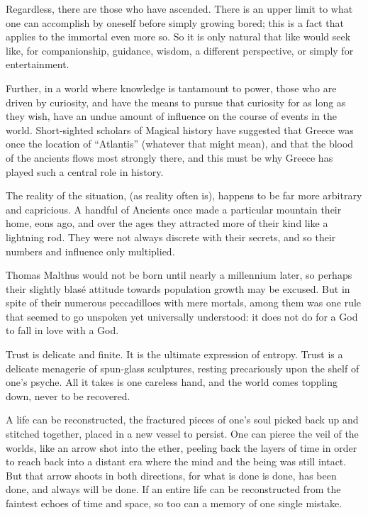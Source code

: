 Regardless, there are those who have ascended. There is an upper limit to what one can accomplish by oneself before simply growing bored; this is a fact that applies to the immortal even more so. So it is only natural that like would seek like, for companionship, guidance, wisdom, a different perspective, or simply for entertainment.

Further, in a world where knowledge is tantamount to power, those who are driven by curiosity, and have the means to pursue that curiosity for as long as they wish, have an undue amount of influence on the course of events in the world. Short-sighted scholars of Magical history have suggested that Greece was once the location of “Atlantis” (whatever that might mean), and that the blood of the ancients flows most strongly there, and this must be why Greece has played such a central role in history.

The reality of the situation, (as reality often is), happens to be far more arbitrary and capricious. A handful of Ancients once made a particular mountain their home, eons ago, and over the ages they attracted more of their kind like a lightning rod. They were not always discrete with their secrets, and so their numbers and influence only multiplied.

Thomas Malthus would not be born until nearly a millennium later, so perhaps their slightly blasé attitude towards population growth may be excused. But in spite of their numerous peccadilloes with mere mortals, among them was one rule that seemed to go unspoken yet universally understood: it does not do for a God to fall in love with a God.

Trust is delicate and finite. It is the ultimate expression of entropy. Trust is a delicate menagerie of spun-glass sculptures, resting precariously upon the shelf of one’s psyche. All it takes is one careless hand, and the world comes toppling down, never to be recovered.

A life can be reconstructed, the fractured pieces of one’s soul picked back up and stitched together, placed in a new vessel to persist. One can pierce the veil of the worlds, like an arrow shot into the ether, peeling back the layers of time in order to reach back into a distant era where the mind and the being was still intact. But that arrow shoots in both directions, for what is done is done, has been done, and always will be done. If an entire life can be reconstructed from the faintest echoes of time and space, so too can a memory of one single mistake.

